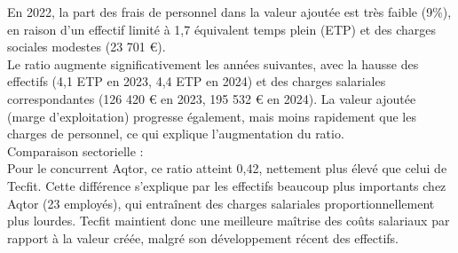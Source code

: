 En 2022, la part des frais de personnel dans la valeur ajoutée est très faible (9\%), en raison d’un effectif limité à 1,7 équivalent temps plein (ETP) et des charges sociales modestes (23 701 €).\\
Le ratio augmente significativement les années suivantes, avec la hausse des effectifs (4,1 ETP en 2023, 4,4 ETP en 2024) et des charges salariales correspondantes (126 420 € en 2023, 195 532 € en 2024). La valeur ajoutée (marge d’exploitation) progresse également, mais moins rapidement que les charges de personnel, ce qui explique l’augmentation du ratio.\\
Comparaison sectorielle :\\
Pour le concurrent Aqtor, ce ratio atteint 0,42, nettement plus élevé que celui de Tecfit. Cette différence s’explique par les effectifs beaucoup plus importants chez Aqtor (23 employés), qui entraînent des charges salariales proportionnellement plus lourdes. Tecfit maintient donc une meilleure maîtrise des coûts salariaux par rapport à la valeur créée, malgré son développement récent des effectifs.

